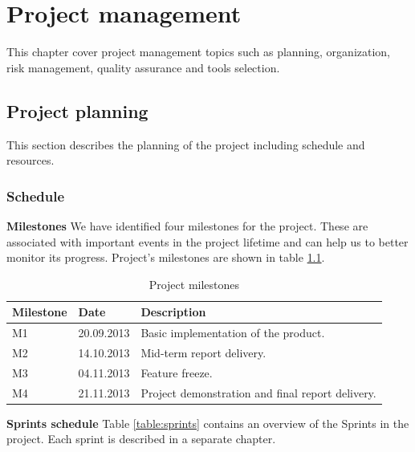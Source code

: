 \chapter{Project management}

\label{ch:management}
\nocite{Sommerville9}

This chapter cover project management topics such as planning, organization, risk management, quality assurance and tools selection.

\section{Project planning}
\label{section:planning}
This section describes the planning of the project including schedule and resources.

\subsection{Schedule}
\label{section:schedule}

\textbf{Milestones} \newline
We have identified four milestones for the project. These are associated with important events in the project lifetime
and can help us to better monitor its progress. Project's milestones are shown in table \ref{table:milestones}.

\begin{table}[h]
\begin{center}
\begin{tabular}{ | l | l | l | }
  \hline
  Milestone & Date & Description \\
  \hline\noalign{\smallskip}\hline
  M1 & 20.09.2013 & Basic implementation of the product. \\
  M2 & 14.10.2013 & Mid-term report delivery. \\
  M3 & 04.11.2013 & Feature freeze. \\
  M4 & 21.11.2013 & Project demonstration and final report delivery. \\
  \hline
\end{tabular}
\end{center}
\caption{Project milestones}
\label{table:milestones}
\end{table}

\textbf{Sprints schedule} \newline
Table \ref{table:sprints} contains an overview of the Sprints in the project.
Each sprint is described in a separate chapter.

